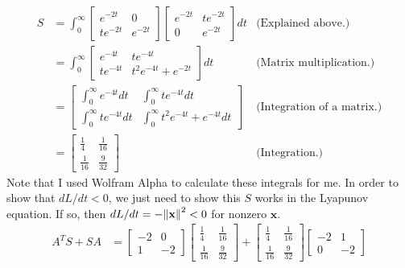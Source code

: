 \begin{solution}
    \newpage
    \alignbreak
    \begin{align}
        S &= \int_0^\infty \begin{bmatrix}e^{-2t} &0\\ te^{-2t} &e^{-2t}\end{bmatrix}\begin{bmatrix}e^{-2t} &te^{-2t}\\ 0 &e^{-2t}\end{bmatrix}dt&\text{(Explained above.)} \nonumber\\
        &= \int_0^\infty \begin{bmatrix}e^{-4t} &te^{-4t} \\ te^{-4t} &t^2e^{-4t} + e^{-2t}\end{bmatrix} dt &\text{(Matrix multiplication.)}\nonumber\\
        &=  \begin{bmatrix}\int_0^\infty e^{-4t} dt & \int_0^\infty te^{-4t} dt \\ \int_0^\infty te^{-4t} dt & \int_0^\infty t^2e^{-4t} + e^{-4t}dt\end{bmatrix} &\text{(Integration of a matrix.)}\nonumber\\
        &= \begin{bmatrix}\frac{1}{4} &\frac{1}{16}\\\frac{1}{16} &\frac{9}{32}\end{bmatrix} &\text{(Integration.)}\nonumber
    \end{align}
    \alignbreak
    Note that I used Wolfram Alpha to calculate these integrals for me. In order to show that $dL/dt < 0$, we just need to show this $S$ works in the Lyapunov equation. If so, then $dL/dt = -\norm{\textbf{x}}^2 < 0$ for nonzero $\textbf{x}$.
    \alignbreak
    \begin{align}
        A^TS + SA &= \begin{bmatrix}-2 &0 \\1 &-2\end{bmatrix} \begin{bmatrix}\frac{1}{4} &\frac{1}{16}\\\frac{1}{16} &\frac{9}{32}\end{bmatrix} + \begin{bmatrix}\frac{1}{4} &\frac{1}{16}\\\frac{1}{16} &\frac{9}{32}\end{bmatrix}\begin{bmatrix}-2 &1 \\0 &-2\end{bmatrix}\nonumber\\

\end{align}
\end{solution}
